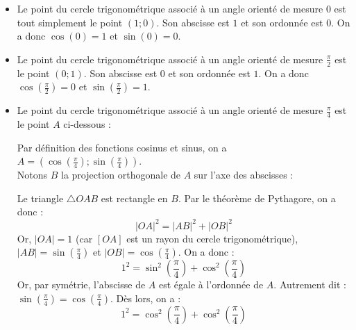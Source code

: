 \documentclass[a4paper,fontsize=13pt]{scrreprt}
\theoremstyle{plain}
\theoremstyle{definition}
\newcommand {\axes} {
	\draw[thick, ->] (\xmin,0) -- (\xmax+1,0);
	\draw[thick, ->] (0,\ymin) -- (0,\ymax+1);
	\draw (0,\ymax+0.5) node [left] {$y$};
	\draw (\xmax+0.5, 0) node [below] {$x$};
	\draw[thick] (-0.15,1)--(0.15,1) (1,-0.15)--(1,0.15);
	\draw (0,1)node[left]{$1$} (1,0)node[below]{$1$};
}
\begin{document}
\begin{itemize}
\item Le point du cercle trigonométrique associé à un angle orienté de mesure $0$ est tout simplement le point $(1;0)$. Son abscisse est $1$ et son ordonnée est $0$. On a donc $\cos(0) = 1$ et $\sin(0)=0$.
\item Le point du cercle trigonométrique associé à un angle orienté de mesure $\frac{\pi}{2}$ est le point $(0;1)$. Son abscisse est $0$ et son ordonnée est $1$. On a donc $\cos(\frac{\pi}{2}) = 0$ et $\sin(\frac{\pi}{2})=1$.
\item Le point du cercle trigonométrique associé à un angle orienté de mesure $\frac{\pi}{4}$ est le point $A$ ci-dessous :
\begin{center}
\end{center}
Par définition des fonctions cosinus et sinus, on a $A=(\cos(\frac{\pi}{4}) ; \sin(\frac{\pi}{4}))$. \\
Notons $B$ la projection orthogonale de $A$ sur l'axe des abscisses :
\begin{center}
\end{center}
Le triangle $\triangle OAB$ est rectangle en $B$. Par le théorème de Pythagore, on a donc :
$${|OA|}^{2}={|AB|}^{2}+{|OB|}^{2}$$
Or, $|OA|=1$ (car $[OA]$ est un rayon du cercle trigonométrique), $|AB|=\sin(\frac{\pi}{4})$ et $|OB|=\cos(\frac{\pi}{4})$. On a donc :
$${1}^{2}=\sin^2(\frac{\pi}{4})+\cos^2(\frac{\pi}{4})$$
Or, par symétrie, l'abscisse de $A$ est égale à l'ordonnée de $A$. Autrement dit : $\sin(\frac{\pi}{4}) = \cos(\frac{\pi}{4})$. Dès lors, on a :
$${1}^{2}=\cos^2(\frac{\pi}{4})+\cos^2(\frac{\pi}{4})$$

\end{itemize}
\end{document}
